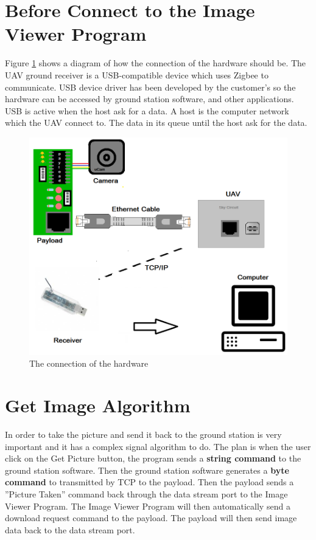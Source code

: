 \section{Before Connect to the Image Viewer Program}
Figure \ref{schemetic_clipA} shows a diagram of how the connection of the hardware should be. 
The UAV ground receiver is a USB-compatible device which uses Zigbee to communicate. 
USB device driver has been developed by the customer’s so the hardware can be accessed by ground station software, and other applications. 
USB is active when the host ask for a data. 
A host is the computer network which the UAV connect to. 
The data in its queue until the host ask for the data. 
\begin{figure}[!hbtp]
\begin{center}
\includegraphics[scale=0.4]{figures/clipArt.png} 
\end{center}
\caption{The connection of the hardware\label{schemetic_clipA}}
\end{figure}

\section{Get Image Algorithm}
In order to take the picture and send it back to the ground station is very important and it has a complex signal algorithm to do.
The plan is when the user click on the Get Picture button, the program sends a \textbf{string command} to the ground station software.
Then the ground station software generates a \textbf{byte command} to transmitted by TCP to the payload. 
Then the payload sends a ''Picture Taken'' command back through the data stream port to the Image Viewer Program. 
The Image Viewer Program will then automatically send a download request command to the payload. 
The payload will then send image data back to the data stream port. 

